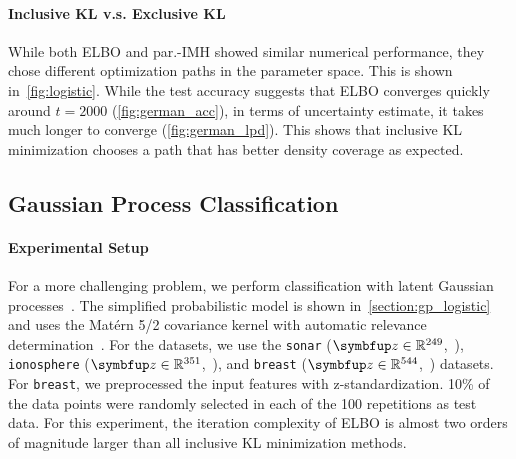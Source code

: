 \paragraph{Inclusive KL v.s. Exclusive KL}
While both ELBO and par.-IMH showed similar numerical performance, they chose different optimization paths in the parameter space.
This is shown in~\cref{fig:logistic}.
While the test accuracy suggests that ELBO converges quickly around \(t=2000\) (\cref{fig:german_acc}), in terms of uncertainty estimate, it takes much longer to converge (\cref{fig:german_lpd}).
This shows that inclusive KL minimization chooses a path that has better density coverage as expected.

  \vspace{-0.05in}
\subsection{Gaussian Process Classification}\label{section:bgp}
  \vspace{-0.05in}
\paragraph{Experimental Setup}
For a more challenging problem, we perform classification with latent Gaussian processes~\citep{NIPS2014_8c6744c9}.
The simplified probabilistic model is shown in~\cref{section:gp_logistic} and uses the Mat\'ern 5/2 covariance kernel with automatic relevance determination~\citep{neal_bayesian_1996}.
For the datasets, we use the \texttt{sonar} (\(\vz \in \mathbb{R}^{249}\),~\citealt{gorman_analysis_1988}), \texttt{ionosphere} (\(\vz \in \mathbb{R}^{351}\),~\citealt{Sigillito1989ClassificationOR}), and \texttt{breast} (\(\vz \in \mathbb{R}^{544}\),~\citealt{wolberg_multisurface_1990}) datasets.
For \texttt{breast}, we preprocessed the input features with z-standardization.
10\% of the data points were randomly selected in each of the 100 repetitions as test data.
For this experiment, the iteration complexity of ELBO is almost two orders of magnitude larger than all inclusive KL minimization methods.

